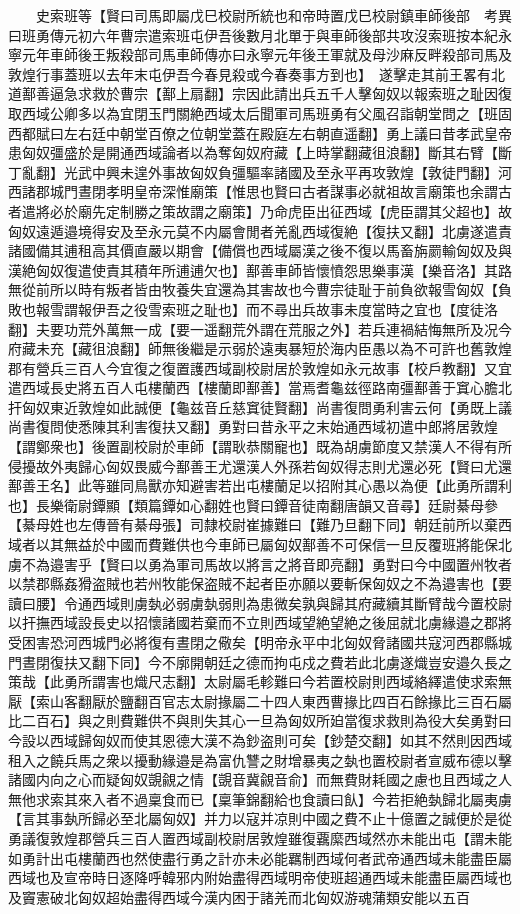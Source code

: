 　　史索班等【賢曰司馬即屬戊巳校尉所統也和帝時置戊巳校尉鎮車師後部　考異曰班勇傳元初六年曹宗遣索班屯伊吾後數月北單于與車師後部共攻沒索班按本紀永寧元年車師後王叛殺部司馬車師傳亦曰永寧元年後王軍就及母沙麻反畔殺部司馬及敦煌行事蓋班以去年末屯伊吾今春見殺或今春奏事方到也】　遂擊走其前王畧有北道鄯善逼急求救於曹宗【鄯上扇翻】宗因此請出兵五千人擊匈奴以報索班之耻因復取西域公卿多以為宜閉玉門關絶西域太后聞軍司馬班勇有父風召詣朝堂問之【班固西都賦曰左右廷中朝堂百僚之位朝堂蓋在殿庭左右朝直遥翻】勇上議曰昔孝武皇帝患匈奴彊盛於是開通西域論者以為奪匈奴府藏【上時掌翻藏徂浪翻】斷其右臂【斷丁亂翻】光武中興未遑外事故匈奴負彊驅率諸國及至永平再攻敦煌【敦徒門翻】河西諸郡城門晝閉孝明皇帝深惟廟策【惟思也賢曰古者謀事必就祖故言廟策也余謂古者遣將必於廟先定制勝之策故謂之廟策】乃命虎臣出征西域【虎臣謂其父超也】故匈奴遠遁邉境得安及至永元莫不内屬會閒者羌亂西域復絶【復扶又翻】北虜遂遣責諸國備其逋租高其價直嚴以期會【備償也西域屬漢之後不復以馬畜旃罽輸匈奴及與漢絶匈奴復遣使責其積年所逋逋欠也】鄯善車師皆懷憤怨思樂事漢【樂音洛】其路無從前所以時有叛者皆由牧養失宜還為其害故也今曹宗徒耻于前負欲報雪匈奴【負敗也報雪謂報伊吾之役雪索班之耻也】而不尋出兵故事未度當時之宜也【度徒洛翻】夫要功荒外萬無一成【要一遥翻荒外謂在荒服之外】若兵連禍結悔無所及况今府藏未充【藏徂浪翻】師無後繼是示弱於遠夷暴短於海内臣愚以為不可許也舊敦煌郡有營兵三百人今宜復之復置護西域副校尉居於敦煌如永元故事【校戶教翻】又宜遣西域長史將五百人屯樓蘭西【樓蘭即鄯善】當焉耆龜兹徑路南彊鄯善于窴心膽北扞匈奴東近敦煌如此誠便【龜兹音丘慈窴徒賢翻】尚書復問勇利害云何【勇既上議尚書復問使悉陳其利害復扶又翻】勇對曰昔永平之末始通西域初遣中郎將居敦煌【謂鄭衆也】後置副校尉於車師【謂耿恭關寵也】既為胡虜節度又禁漢人不得有所侵擾故外夷歸心匈奴畏威今鄯善王尤還漢人外孫若匈奴得志則尤還必死【賢曰尤還鄯善王名】此等雖同鳥獸亦知避害若出屯樓蘭足以招附其心愚以為便【此勇所謂利也】長樂衛尉鐔顯【類篇鐔如心翻姓也賢曰鐔音徒南翻唐韻又音尋】廷尉綦母參【綦母姓也左傳晉有綦母張】司隸校尉崔據難曰【難乃旦翻下同】朝廷前所以棄西域者以其無益於中國而費難供也今車師已屬匈奴鄯善不可保信一旦反覆班將能保北虜不為邉害乎【賢曰以勇為軍司馬故以將言之將音即亮翻】勇對曰今中國置州牧者以禁郡縣姦猾盗賊也若州牧能保盗賊不起者臣亦願以要斬保匈奴之不為邉害也【要讀曰腰】令通西域則虜埶必弱虜埶弱則為患微矣孰與歸其府藏續其斷臂哉今置校尉以扞撫西域設長史以招懷諸國若棄而不立則西域望絶望絶之後屈就北虜緣邉之郡將受困害恐河西城門必將復有晝閉之儆矣【明帝永平中北匈奴脅諸國共寇河西郡縣城門晝閉復扶又翻下同】今不廓開朝廷之德而拘屯戍之費若此北虜遂熾豈安邉久長之策哉【此勇所謂害也熾尺志翻】太尉屬毛軫難曰今若置校尉則西域絡繹遣使求索無厭【索山客翻厭於鹽翻百官志太尉掾屬二十四人東西曹掾比四百石餘掾比三百石屬比二百石】與之則費難供不與則失其心一旦為匈奴所廹當復求救則為役大矣勇對曰今設以西域歸匈奴而使其恩德大漢不為鈔盗則可矣【鈔楚交翻】如其不然則因西域租入之饒兵馬之衆以擾動緣邉是為富仇讐之財增暴夷之埶也置校尉者宣威布德以擊諸國内向之心而疑匈奴覬覦之情【覬音冀覦音俞】而無費財耗國之慮也且西域之人無他求索其來入者不過稟食而已【稟筆錦翻給也食讀曰飤】今若拒絶埶歸北屬夷虜【言其事埶所歸必至北屬匈奴】并力以寇并凉則中國之費不止十億置之誠便於是從勇議復敦煌郡營兵三百人置西域副校尉居敦煌雖復覊縻西域然亦未能出屯【謂未能如勇計出屯樓蘭西也然使盡行勇之計亦未必能羈制西域何者武帝通西域未能盡臣屬西域也及宣帝時日逐降呼韓邪内附始盡得西域明帝使班超通西域未能盡臣屬西域也及竇憲破北匈奴超始盡得西域今漢内困于諸羌而北匈奴游魂蒲類安能以五百